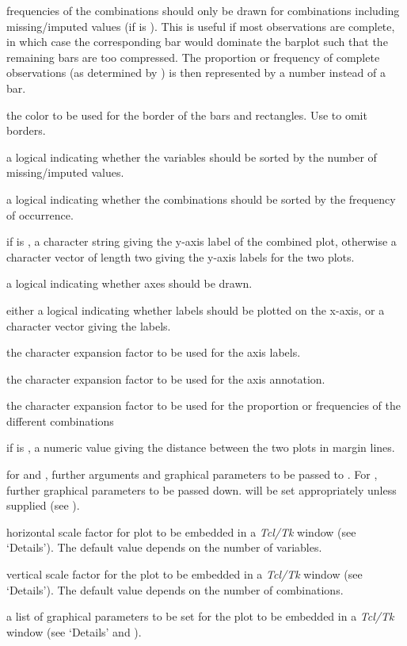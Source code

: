 \begin{Arguments}
\begin{ldescription}
frequencies of the combinations should only be drawn for combinations 
including missing/imputed values (if  is ).  This is useful 
if most observations are complete, in which case the corresponding bar would 
dominate the barplot such that the remaining bars are too compressed.  The 
proportion or frequency of complete observations (as determined by 
) is then represented by a number instead of a bar.
\item[\code{border}] the color to be used for the border of the bars and 
rectangles.  Use  to omit borders.
\item[\code{sortVars}] a logical indicating whether the variables should be 
sorted by the number of missing/imputed values.
\item[\code{sortCombs}] a logical indicating whether the combinations should be 
sorted by the frequency of occurrence.
\item[\code{ylabs}] if  is , a character string giving the 
y-axis label of the combined plot, otherwise a character vector of 
length two giving the y-axis labels for the two plots.
\item[\code{axes}] a logical indicating whether axes should be drawn.
\item[\code{labels}] either a logical indicating whether labels should be 
plotted on the x-axis, or a character vector giving the labels.
\item[\code{cex.lab}] the character expansion factor to be used for the axis labels.
\item[\code{cex.axis}] the character expansion factor to be used for the axis 
annotation.
\item[\code{cex.numbers}] the character expansion factor to be used for the 
proportion or frequencies of the different combinations
\item[\code{gap}] if  is , a numeric value giving the 
distance between the two plots in margin lines.
\item[\code{...}] for  and , further arguments and 
graphical parameters to be passed to .  For 
, further graphical parameters to be passed down.  
 will be set appropriately unless supplied (see 
).
\item[\code{hscale}] horizontal scale factor for plot to be embedded in a 
\emph{Tcl/Tk} window (see `Details').  The default value 
depends on the number of variables.
\item[\code{vscale}] vertical scale factor for the plot to be embedded in a 
\emph{Tcl/Tk} window (see `Details').  The default value 
depends on the number of combinations.
\item[\code{TKRpar}] a list of graphical parameters to be set for the plot 
to be embedded in a \emph{Tcl/Tk} window (see `Details' and 
).
\end{ldescription}
\end{Arguments}
